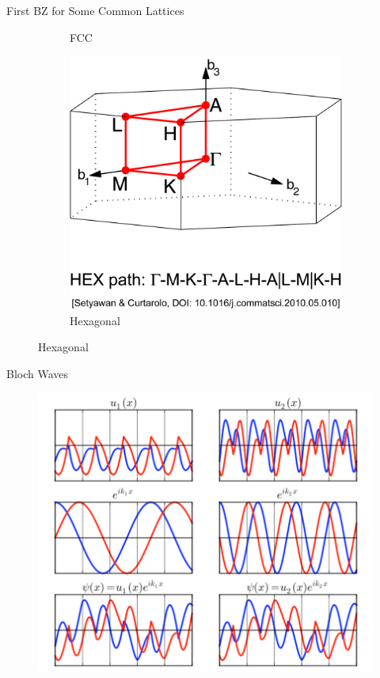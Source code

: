 \documentclass[aspectratio=169]{beamer}
\begin{document}
\begin{frame}{First BZ for Some Common Lattices}
\begin{figure}
\begin{subfigure}{0.24\textwidth}
                \caption{FCC}
            \end{subfigure}
            \begin{subfigure}{0.24\textwidth}
                \includegraphics[width=\linewidth]{lectures/figures/7_Brillouin_Zone_Hex.png}
                \caption{Hexagonal}
            \end{subfigure}
        \end{figure}

    \end{frame}

    \begin{frame}{Bloch Waves}
        \begin{figure}
            \centering
            \includegraphics[width=0.5\linewidth]{lectures/figures/7_Bloch_Waves.png}
        \end{figure}
    \end{frame}
\end{document}
